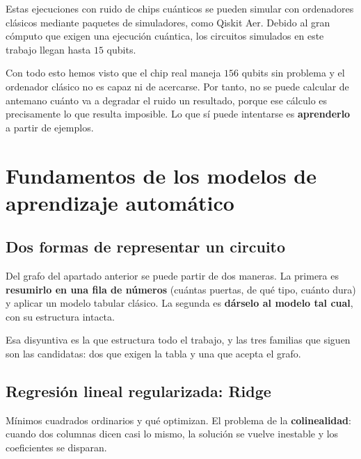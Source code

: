 Estas ejecuciones con ruido de chips cuánticos se pueden simular con ordenadores clásicos mediante paquetes de 
simuladores, como Qiskit Aer. Debido al gran cómputo que exigen una ejecución cuántica, los 
circuitos simulados en este trabajo llegan hasta $15$ qubits.

Con todo esto hemos visto que el chip real maneja $156$ qubits sin problema y el ordenador clásico no es capaz
ni de acercarse. Por tanto, no se puede calcular de antemano cuánto va a degradar
el ruido un resultado, porque ese cálculo es precisamente lo que resulta imposible. Lo
que sí puede intentarse es \textbf{aprenderlo} a partir de ejemplos.

\section{Fundamentos de los modelos de aprendizaje automático}
\label{sec:fund_ia}
%

\subsection{Dos formas de representar un circuito}
\label{sec:dos_representaciones}
Del grafo del apartado anterior se puede partir de dos maneras. La primera es
\textbf{resumirlo en una fila de números} (cuántas puertas, de qué tipo, cuánto dura) y
aplicar un modelo tabular clásico. La segunda es \textbf{dárselo al modelo tal cual}, con su
estructura intacta.

Esa disyuntiva es la que estructura todo el trabajo, y las tres familias que siguen son las
candidatas: dos que exigen la tabla y una que acepta el grafo.

\subsection{Regresión lineal regularizada: Ridge}
\label{sec:teoria_ridge}
Mínimos cuadrados ordinarios y qué optimizan. El problema de la \textbf{colinealidad}: cuando
dos columnas dicen casi lo mismo, la solución se vuelve inestable y los coeficientes se
disparan.

